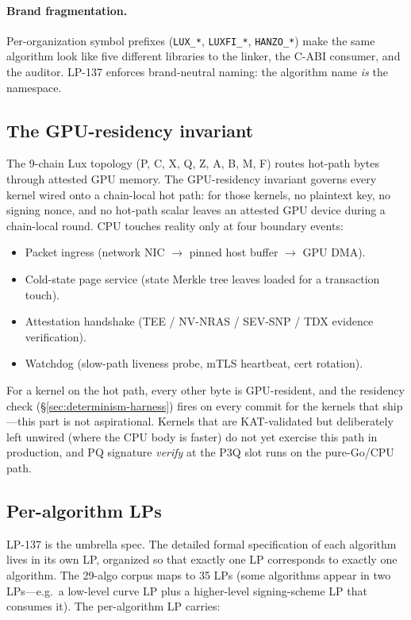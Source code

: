\paragraph{Brand fragmentation.} Per-organization symbol prefixes (\texttt{LUX\_*}, \texttt{LUXFI\_*}, \texttt{HANZO\_*}) make the same algorithm look like five different libraries to the linker, the C-ABI consumer, and the auditor. LP-137 enforces brand-neutral naming: the algorithm name \emph{is} the namespace.

\subsection{The GPU-residency invariant}

The 9-chain Lux topology (P, C, X, Q, Z, A, B, M, F) routes hot-path bytes through attested GPU memory. The GPU-residency invariant governs every kernel wired onto a chain-local hot path: for those kernels, no plaintext key, no signing nonce, and no hot-path scalar leaves an attested GPU device during a chain-local round. CPU touches reality only at four boundary events:

\begin{itemize}
\item Packet ingress (network NIC $\rightarrow$ pinned host buffer $\rightarrow$ GPU DMA).
\item Cold-state page service (state Merkle tree leaves loaded for a transaction touch).
\item Attestation handshake (TEE / NV-NRAS / SEV-SNP / TDX evidence verification).
\item Watchdog (slow-path liveness probe, mTLS heartbeat, cert rotation).
\end{itemize}

For a kernel on the hot path, every other byte is GPU-resident, and the residency check (\S\ref{sec:determinism-harness}) fires on every commit for the kernels that ship---this part is not aspirational. Kernels that are KAT-validated but deliberately left unwired (where the CPU body is faster) do not yet exercise this path in production, and PQ signature \emph{verify} at the P3Q slot runs on the pure-Go/CPU path.

\subsection{Per-algorithm LPs}

LP-137 is the umbrella spec. The detailed formal specification of each algorithm lives in its own LP, organized so that exactly one LP corresponds to exactly one algorithm. The 29-algo corpus maps to 35 LPs (some algorithms appear in two LPs---e.g.\ a low-level curve LP plus a higher-level signing-scheme LP that consumes it). The per-algorithm LP carries:

